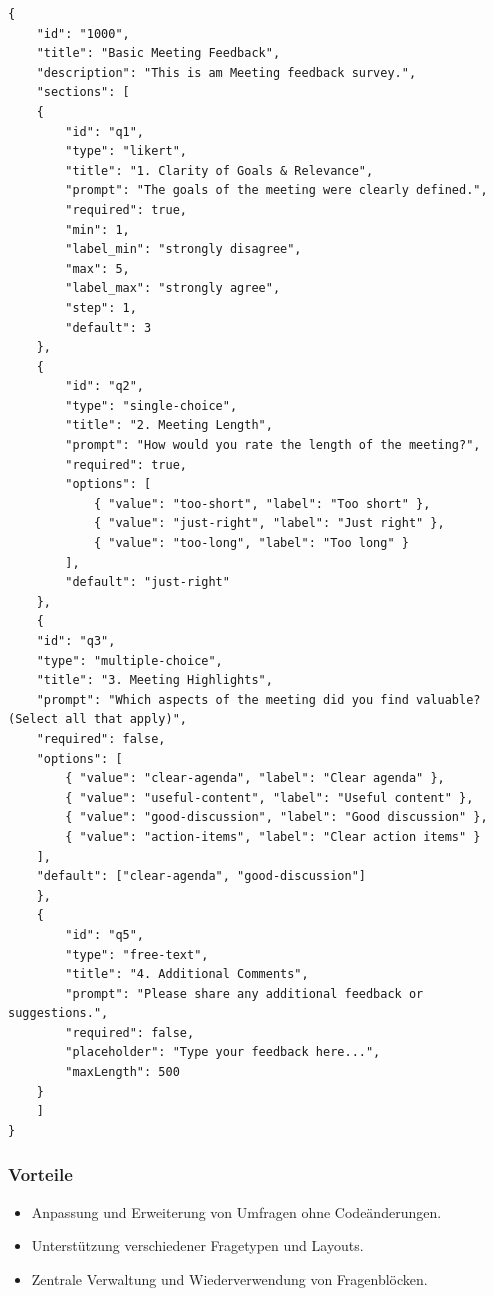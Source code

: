 \documentclass[12pt,a4paper]{report}
\begin{document}
\begin{verbatim}
{
    "id": "1000",
    "title": "Basic Meeting Feedback",
    "description": "This is am Meeting feedback survey.",
    "sections": [
    {
        "id": "q1",
        "type": "likert",
        "title": "1. Clarity of Goals & Relevance",
        "prompt": "The goals of the meeting were clearly defined.",
        "required": true,
        "min": 1,
        "label_min": "strongly disagree",
        "max": 5,
        "label_max": "strongly agree",
        "step": 1,
        "default": 3
    },
    {
        "id": "q2",
        "type": "single-choice",
        "title": "2. Meeting Length",
        "prompt": "How would you rate the length of the meeting?",
        "required": true,
        "options": [
            { "value": "too-short", "label": "Too short" },
            { "value": "just-right", "label": "Just right" },
            { "value": "too-long", "label": "Too long" }
        ],
        "default": "just-right"
    },
    {
    "id": "q3",
    "type": "multiple-choice",
    "title": "3. Meeting Highlights",
    "prompt": "Which aspects of the meeting did you find valuable? (Select all that apply)",
    "required": false,
    "options": [
        { "value": "clear-agenda", "label": "Clear agenda" },
        { "value": "useful-content", "label": "Useful content" },
        { "value": "good-discussion", "label": "Good discussion" },
        { "value": "action-items", "label": "Clear action items" }
    ],
    "default": ["clear-agenda", "good-discussion"]
    },
    {
        "id": "q5",
        "type": "free-text",
        "title": "4. Additional Comments",
        "prompt": "Please share any additional feedback or suggestions.",
        "required": false,
        "placeholder": "Type your feedback here...",
        "maxLength": 500
    }
    ]
}
\end{verbatim}

    \subsubsection{Vorteile}
        \begin{itemize}
            \item Anpassung und Erweiterung von Umfragen ohne Codeänderungen.
            \item Unterstützung verschiedener Fragetypen und Layouts.
            \item Zentrale Verwaltung und Wiederverwendung von Fragenblöcken.
        \end{itemize}
\end{document}
